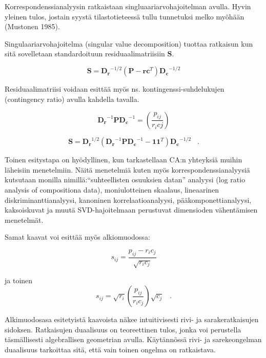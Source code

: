 \documentclass[
  finnish,
]{book}
\begin{document}
Korrespondenssianalyysin ratkaistaan singluaariarvohajoitelman avulla. Hyvin
yleinen tulos, jostain syystä tilastotieteessä tullu tunnetuksi melko myöhään
(Mustonen 1985).

Singulaariarvohajoitelma (singular value decomposition) tuottaa ratkaisun kun
sitä sovelletaan standardoituun residuaalimatriisiin \(\boldsymbol{S}\).

\begin{equation}
\boldsymbol{S} = \boldsymbol{D_r}^{-1/2}(\boldsymbol{P} - \boldsymbol{r}\boldsymbol{c}^T)\boldsymbol{D_c}^{-1/2}
\label{eq:svd1}
\end{equation}

Residuaalimatriisi voidaan esittää myös ns. kontingenssi-suhdelukujen
(contingency ratio) avulla kahdella tavalla.

\begin{equation}
\boldsymbol{D_r}^{-1} \boldsymbol{P} \boldsymbol{D_c}^{-1} = \left( \frac{p_{ij}} {r_{i} c{j}} \right)
\label{eq:contrat1}
\end{equation}

\begin{equation}
\boldsymbol{S} = \boldsymbol{D_r}^{1/2} (\boldsymbol{D_r}^{-1} \boldsymbol{P} \boldsymbol{D_c}^{-1} - \boldsymbol{1}\boldsymbol{1}^{T} ) \boldsymbol{D_c}^{-1/2}  \;\;\; .
\label{eq:contrat2}
\end{equation}

Toinen esitystapa on hyödyllinen, kun tarkastellaan CA:n yhteyksiä muihin
läheisiin menetelmiin. Näitä menetelmiä kuten myös korrespondenssianalyysiä kutsutaan monilla
nimillä:``suhteellisten osuuksien datan'' analyysi (log ratio analysis of compositiona data),
moniulotteinen skaalaus, lineaarinen diskriminanttianalyysi, kanoninen korrelaatioanalyysi,
pääkomponettianalyysi, kaksoiskuvat ja muutä SVD-hajoitelmaan perustuvat dimensioden
vähentämisen menetelmät.

Samat kaavat voi esittää myös alkiomuodossa:

\begin{equation}
s_{ij} = \frac{p_{ij}-r_{i}c_{j}} { \sqrt{r_{i}c_{j} } }
\label{eq:contrat11}
\end{equation}

ja toinen
\begin{equation}
s_{ij} = \sqrt{r_{i}} \left( \frac{p_{ij}}{r_{i}c_{j}} \right) \sqrt{c_{j}} \;\;\; .
\label{eq:contrat21}
\end{equation}

Alkimuodosasa esitetyistä kaavoista näkee intuitivisesti rivi- ja sarakeratkaisujen sidoksen.
Ratkaisujen duaalisuus on teoreettinen tulos, jonka voi perustella täsmällisesti
algebrallisen geometrian avulla. Käytännössä rivi- ja sarekeongelman duaalisuus tarkoittaa sitä,
että vain toinen ongelma on ratkaistava.
\end{document}
